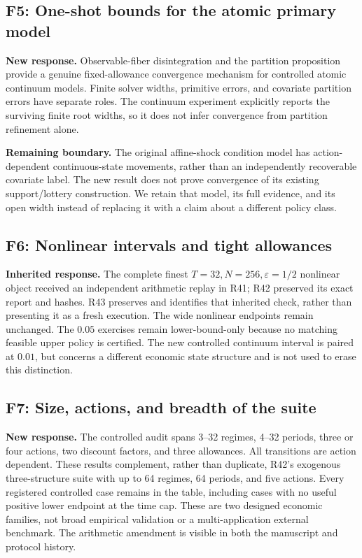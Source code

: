 \subsection*{F5: One-shot bounds for the atomic primary model}
\textbf{New response.} Observable-fiber disintegration and the partition proposition provide a genuine fixed-allowance convergence mechanism for controlled atomic continuum models. Finite solver widths, primitive errors, and covariate partition errors have separate roles. The continuum experiment explicitly reports the surviving finite root widths, so it does not infer convergence from partition refinement alone.

\textbf{Remaining boundary.} The original affine-shock condition model has action-dependent continuous-state movements, rather than an independently recoverable covariate label. The new result does not prove convergence of its existing support/lottery construction. We retain that model, its full evidence, and its open width instead of replacing it with a claim about a different policy class.

\subsection*{F6: Nonlinear intervals and tight allowances}
\textbf{Inherited response.} The complete finest $T=32,N=256,\varepsilon=1/2$ nonlinear object received an independent arithmetic replay in R41; R42 preserved its exact report and hashes. R43 preserves and identifies that inherited check, rather than presenting it as a fresh execution. The wide nonlinear endpoints remain unchanged. The $0.05$ exercises remain lower-bound-only because no matching feasible upper policy is certified. The new controlled continuum interval is paired at $0.01$, but concerns a different economic state structure and is not used to erase this distinction.

\subsection*{F7: Size, actions, and breadth of the suite}
\textbf{New response.} The controlled audit spans 3--32 regimes, 4--32 periods, three or four actions, two discount factors, and three allowances. All transitions are action dependent. These results complement, rather than duplicate, R42's exogenous three-structure suite with up to 64 regimes, 64 periods, and five actions. Every registered controlled case remains in the table, including cases with no useful positive lower endpoint at the time cap. These are two designed economic families, not broad empirical validation or a multi-application external benchmark. The arithmetic amendment is visible in both the manuscript and protocol history.

